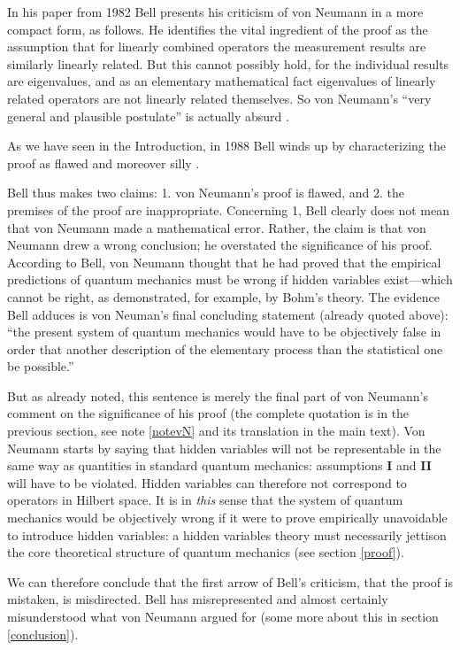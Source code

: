 \documentclass[12pt]{article}
\begin{document}
In his paper from 1982 \cite{bell82} Bell presents his criticism of von Neumann in a more compact form, as follows. He identifies the vital ingredient of the proof as the assumption that for linearly combined operators the measurement results are similarly linearly related. But this cannot possibly hold, for the individual results are eigenvalues, and as an elementary mathematical fact eigenvalues of linearly related operators are not linearly related themselves. So von Neumann's ``very general and plausible postulate'' is actually absurd \cite[p.\@ 994]{bell82}.

As we have seen in the Introduction, in 1988 Bell winds up by characterizing the proof as flawed and moreover silly \cite{bell88}.

Bell thus makes two claims: 1. von Neumann's proof is flawed, and 2. the premises of the proof are inappropriate. Concerning 1, Bell clearly does not mean that von Neumann made a mathematical error. Rather, the claim is that von Neumann drew a wrong conclusion; he overstated the significance of his proof. According to Bell, von Neumann thought that he had proved that the empirical predictions of quantum mechanics must be wrong if hidden variables exist---which cannot be right, as demonstrated, for example, by Bohm's theory. The evidence Bell adduces is von Neuman's final concluding statement (already quoted above): ``the present system of quantum mechanics would have to be objectively false in order that another description of the elementary process than the statistical one be possible.''

But as already noted, this sentence is merely the final part of von Neumann's comment on the significance of his proof (the complete quotation is in the previous section, see note \ref{notevN} and its translation in the main text). Von Neumann starts by saying that hidden variables will not be representable in the same way as quantities in standard quantum mechanics: assumptions \textbf{I} and \textbf{II} will have to be violated. Hidden variables can therefore not correspond to operators in Hilbert space. It is in \emph{this} sense that the system of quantum mechanics would be objectively wrong if it were to prove empirically unavoidable to introduce hidden variables: a hidden variables theory must necessarily jettison the core theoretical structure of quantum mechanics (see section \ref{proof}).

We can therefore conclude that the first arrow of Bell's criticism, that the proof is mistaken, is misdirected. Bell has misrepresented and almost certainly misunderstood what von Neumann argued for (some more about this in section \ref{conclusion}).
\end{document}
